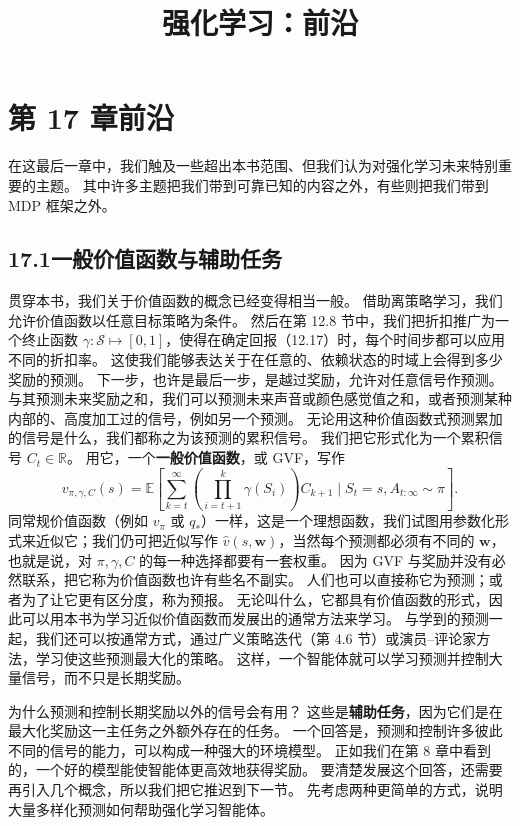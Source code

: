 \documentclass[UTF8, 12pt, fontset=fandol, oneside]{ctexart}
\title{强化学习：前沿}
\author{}
\date{}
\begin{document}
\maketitle

\section*{第 17 章\quad 前沿}

在这最后一章中，我们触及一些超出本书范围、但我们认为对强化学习未来特别重要的主题。
其中许多主题把我们带到可靠已知的内容之外，有些则把我们带到 MDP 框架之外。

\subsection*{17.1\quad 一般价值函数与辅助任务}

贯穿本书，我们关于价值函数的概念已经变得相当一般。
借助离策略学习，我们允许价值函数以任意目标策略为条件。
然后在第 12.8 节中，我们把折扣推广为一个终止函数 $\gamma:\mathcal{S}\mapsto[0,1]$，使得在确定回报（12.17）时，每个时间步都可以应用不同的折扣率。
这使我们能够表达关于在任意的、依赖状态的时域上会得到多少奖励的预测。
下一步，也许是最后一步，是越过奖励，允许对任意信号作预测。
与其预测未来奖励之和，我们可以预测未来声音或颜色感觉值之和，或者预测某种内部的、高度加工过的信号，例如另一个预测。
无论用这种价值函数式预测累加的信号是什么，我们都称之为该预测的累积信号。
我们把它形式化为一个累积信号 $C_t\in\mathbb{R}$。
用它，一个\textbf{一般价值函数}，或 GVF，写作
\begin{equation}
v_{\pi,\gamma,C}(s)=
\mathbb{E}\left[
\sum_{k=t}^{\infty}
\left(\prod_{i=t+1}^{k}\gamma(S_i)\right)C_{k+1}
\mid S_t=s,A_{t:\infty}\sim\pi
\right].
\tag{17.1}
\end{equation}
同常规价值函数（例如 $v_\pi$ 或 $q_*$）一样，这是一个理想函数，我们试图用参数化形式来近似它；我们仍可把近似写作 $\hat v(s,\mathbf{w})$，当然每个预测都必须有不同的 $\mathbf{w}$，也就是说，对 $\pi,\gamma,C$ 的每一种选择都要有一套权重。
因为 GVF 与奖励并没有必然联系，把它称为价值函数也许有些名不副实。
人们也可以直接称它为预测；或者为了让它更有区分度，称为预报。
无论叫什么，它都具有价值函数的形式，因此可以用本书为学习近似价值函数而发展出的通常方法来学习。
与学到的预测一起，我们还可以按通常方式，通过广义策略迭代（第 4.6 节）或演员--评论家方法，学习使这些预测最大化的策略。
这样，一个智能体就可以学习预测并控制大量信号，而不只是长期奖励。

为什么预测和控制长期奖励以外的信号会有用？
这些是\textbf{辅助任务}，因为它们是在最大化奖励这一主任务之外额外存在的任务。
一个回答是，预测和控制许多彼此不同的信号的能力，可以构成一种强大的环境模型。
正如我们在第 8 章中看到的，一个好的模型能使智能体更高效地获得奖励。
要清楚发展这个回答，还需要再引入几个概念，所以我们把它推迟到下一节。
先考虑两种更简单的方式，说明大量多样化预测如何帮助强化学习智能体。
\end{document}
